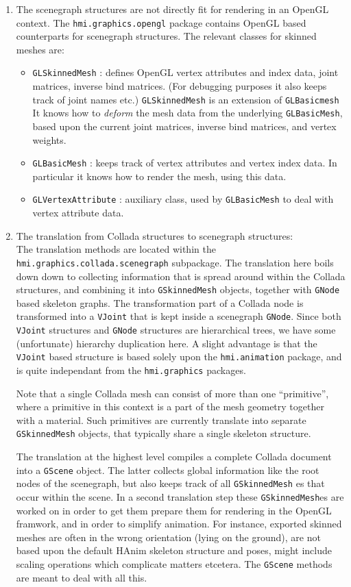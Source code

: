 \begin{enumerate}
\item The scenegraph structures are not directly fit for rendering in an OpenGL context.
The \verb"hmi.graphics.opengl" package contains OpenGL based counterparts for scenegraph structures.
The relevant classes for skinned meshes are:
\begin{itemize}
\item \verb"GLSkinnedMesh" : defines OpenGL vertex attributes and index data, joint matrices,
inverse bind matrices. (For debugging purposes it also keeps track of joint names etc.)
\verb"GLSkinnedMesh" is an extension of \verb"GLBasicmesh" 
It knows how to \emph{deform} the mesh data from the underlying \verb"GLBasicMesh", based upon the
current joint matrices, inverse bind matrices, and vertex weights.
\item \verb"GLBasicMesh" : keeps track of vertex attributes and vertex index data.
In particular it knows how to render the mesh, using this data.
\item \verb"GLVertexAttribute" : auxiliary class, used by \verb"GLBasicMesh" to deal
with vertex attribute data.
\end{itemize}


\item The translation from Collada structures to scenegraph structures:\\
The translation methods are located within the \verb"hmi.graphics.collada.scenegraph" subpackage.
The translation here boils down down to collecting information that is spread around within the Collada
structures, and combining it into  \verb"GSkinnedMesh" objects, together
with \verb"GNode" based skeleton graphs. The transformation part of a Collada node is transformed into
a \verb"VJoint" that is kept inside a scenegraph  \verb"GNode". 
Since both \verb"VJoint" structures and \verb"GNode" structures
are hierarchical trees, we have some (unfortunate) hierarchy duplication here. 
A slight advantage is that the \verb"VJoint" based structure is based solely upon
the \verb"hmi.animation" package, and is quite independant from the \verb"hmi.graphics" packages.

Note that a single Collada mesh can consist of more than one ``primitive'', where a primitive in this context 
is a part of the mesh geometry together with a material. Such primitives are currently translate
into separate \verb"GSkinnedMesh" objects, that typically share a single skeleton structure.


The translation at the highest level compiles a complete Collada document into a \verb"GScene" object.
The latter collects global information like the root nodes of the scenegraph, but also keeps track of 
all \verb"GSkinnedMesh" es that occur within the scene.
In a second translation step these \verb"GSkinnedMesh"es are worked on in order to
get them prepare them for rendering in the OpenGL framwork, and in order to simplify animation.
For instance, exported skinned meshes are often in the wrong orientation (lying on the ground),
are not based upon the default HAnim skeleton structure and poses, might include scaling operations
which complicate matters etcetera. The \verb"GScene" methods are meant to deal with all this. 


\end{enumerate}
